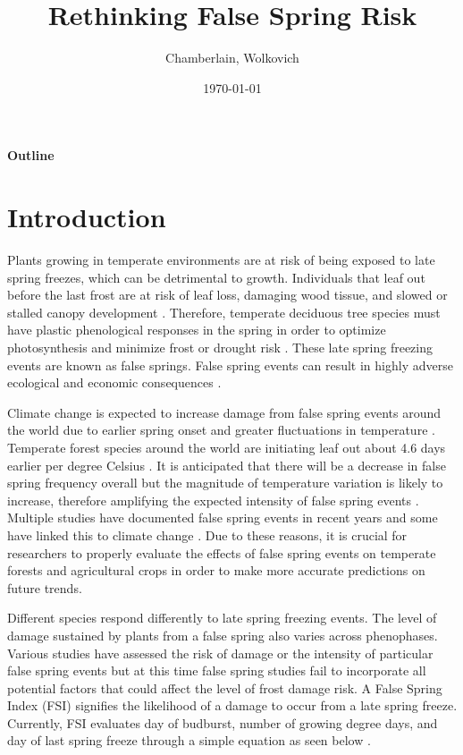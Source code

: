 \documentclass{article}\usepackage[]{graphicx}\usepackage[]{color}
\begin{document}
\title{Rethinking False Spring Risk}
\author{Chamberlain, Wolkovich}
\date{\today}
\maketitle 

\renewcommand{\thetable}{\arabic{table}}
\renewcommand{\thefigure}{\arabic{figure}}
\renewcommand{\labelitemi}{$-$}

\begin{center}
\LARGE\textbf{Outline}
\end{center}
\section{Introduction}
Plants growing in temperate environments are at risk of being exposed to late spring freezes, which can be detrimental to growth. Individuals that leaf out before the last frost are at risk of leaf loss, damaging wood tissue, and slowed or stalled canopy development \citep{Gu2008, Hufkens2012}. Therefore, temperate deciduous tree species must have plastic phenological responses in the spring in order to optimize photosynthesis and minimize frost or drought risk \citep{Polgar2011}. These late spring freezing events are known as false springs. False spring events can result in highly adverse ecological and economic consequences \citep{Ault2013, Knudson2012}.

Climate change is expected to increase damage from false spring events around the world due to earlier spring onset and greater fluctuations in temperature \citep{Martin2010, Inouye2008, Cannell1986}. Temperate forest species around the world are initiating leaf out about 4.6 days earlier per degree Celsius \citep{Polgar2014, Wolkovich2012}. It is anticipated that there will be a decrease in false spring frequency overall but the magnitude of temperature variation is likely to increase, therefore amplifying the expected intensity of false spring events \citep{Allstadt2015, Kodra2011}. Multiple studies have documented false spring events in recent years \citep{Augspurger2013, Knudson2012, Augspurger2009, Gu2008} and some have linked this to climate change \citep{Muffler2016, Xin2016, Allstadt2015, Ault2013}. Due to these reasons, it is crucial for researchers to properly evaluate the effects of false spring events on temperate forests and agricultural crops in order to make more accurate predictions on future trends.

Different species respond differently to late spring freezing events. The level of damage sustained by plants from a false spring also varies across phenophases. Various studies have assessed the risk of damage or the intensity of particular false spring events but at this time false spring studies fail to incorporate all potential factors that could affect the level of frost damage risk. A False Spring Index (FSI) signifies the likelihood of a damage to occur from a late spring freeze. Currently, FSI evaluates day of budburst, number of growing degree days, and day of last spring freeze through a simple equation as seen below \citep{Marino2011}. 
\end{document}
